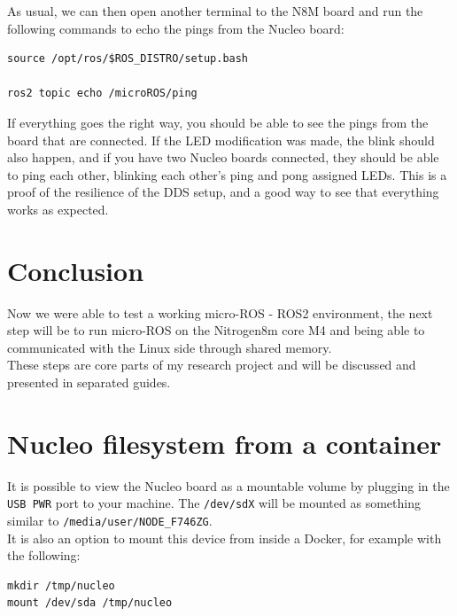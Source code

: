 \documentclass[10pt]{article}
\begin{document}
As usual, we can then open another terminal to the N8M board and run the following commands to echo the pings from the Nucleo board:
\begin{tcolorbox}
\begin{verbatim}
source /opt/ros/$ROS_DISTRO/setup.bash

ros2 topic echo /microROS/ping
\end{verbatim}
\end{tcolorbox}

If everything goes the right way, you should be able to see the pings from the board that are connected. If the LED modification was made, the blink should also happen, and if you have two Nucleo boards connected, they should be able to ping each other, blinking each other's ping and pong assigned LEDs. This is a proof of the resilience of the DDS setup, and a good way to see that everything works as expected.

\section{Conclusion}
\label{sec:conclusion}
Now we were able to test a working micro-ROS - ROS2 environment, the next step will be to run micro-ROS on the Nitrogen8m core M4 and being able to communicated with the Linux side through shared memory.\\

These steps are core parts of my research project and will be discussed and presented in separated guides.


\pagebreak
\appendix
\section{Nucleo filesystem from a container}
\label{appendix:nucl-filesyst-from}
It is possible to view the Nucleo board as a mountable volume by plugging in the \verb|USB PWR| port to your machine. The \verb|/dev/sdX| will be mounted as something similar to \verb|/media/user/NODE_F746ZG|.\\
It is also an option to mount this device from inside a Docker, for example with the following:
\begin{tcolorbox}
\begin{verbatim}
mkdir /tmp/nucleo
mount /dev/sda /tmp/nucleo
\end{verbatim}
\end{tcolorbox}
\end{document}
